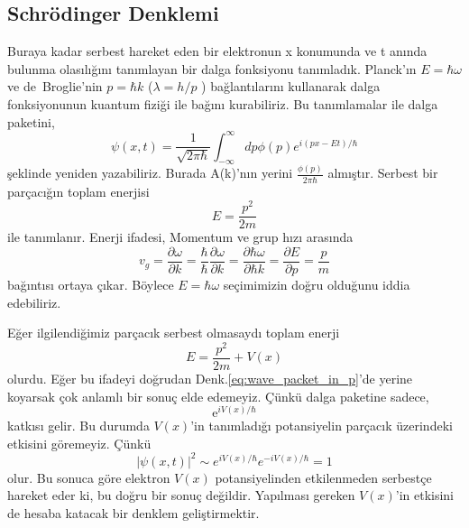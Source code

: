 \documentclass[a4paper,12pt, twoside]{article}
\begin{document}
\subsection{Schrödinger Denklemi}

Buraya kadar serbest hareket eden bir elektronun x konumunda ve t anında bulunma olasılığını tanımlayan bir dalga fonksiyonu tanımladık. Planck'ın $E=\hbar\omega$  ve de~Broglie'nin $p=\hbar k$  ($\lambda = h/p$ )  bağlantılarını kullanarak  dalga fonksiyonunun kuantum fiziği ile bağını kurabiliriz.  Bu tanımlamalar ile dalga paketini,
\begin{equation}
\psi \left( x,t\right) =\dfrac {1}{\sqrt {2\pi \hbar }}\int ^{\infty }_{-\infty }dp\phi \left( p\right) e^{i\left( px-Et\right) /\hbar }
\label{eq:wave_packet_in_p}
\end{equation}
şeklinde yeniden yazabiliriz.  Burada A(k)'nın  yerini $\frac{\phi(p)}{2\pi\hbar}$  almıştır.  Serbest bir parçacığın toplam enerjisi
\begin{equation}
E=\dfrac {p^{2}}{2m}
\label{eq:free_particle_E}
\end{equation}
ile tanımlanır.  Enerji ifadesi,  Momentum ve grup hızı arasında
\begin{equation*}
v_{g}=\dfrac {\partial \omega }{\partial k}=\dfrac {\hbar }{\hbar }\dfrac {\partial \omega }{\partial k}=\dfrac {\partial\hbar \omega }{\partial \hbar k}=\dfrac {\partial E}{\partial p}=\dfrac {p}{m}
\end{equation*}
bağıntısı ortaya çıkar.  Böylece $E=\hbar \omega$ seçimimizin doğru olduğunu iddia edebiliriz. 

Eğer ilgilendiğimiz parçacık serbest olmasaydı toplam enerji
\begin{equation}
E=\dfrac {p^{2}}{2m} + V(x)
\label{eq:non_free_particle_E}
\end{equation}
olurdu.  Eğer bu ifadeyi doğrudan Denk.\ref{eq:wave_packet_in_p}'de yerine koyarsak çok anlamlı bir sonuç elde edemeyiz.  Çünkü dalga paketine sadece,
\begin{equation*}
\text{e}^{iV\left( x\right) /\hbar }
\end{equation*}
katkısı gelir.  Bu durumda $V(x)$'in  tanımladığı potansiyelin parçacık üzerindeki etkisini göremeyiz.  Çünkü
\begin{equation*}
\left| \psi \left( x,t\right) \right| ^{2}\sim e^{iV\left( x\right) /\hbar }e^{-iV\left( x\right) /\hbar }=1
\end{equation*}
olur. Bu sonuca göre elektron $V(x)$  potansiyelinden  etkilenmeden serbestçe hareket eder ki,  bu doğru bir  sonuç değildir. Yapılması gereken $V(x)$'in etkisini de hesaba katacak bir denklem geliştirmektir.
\end{document}
